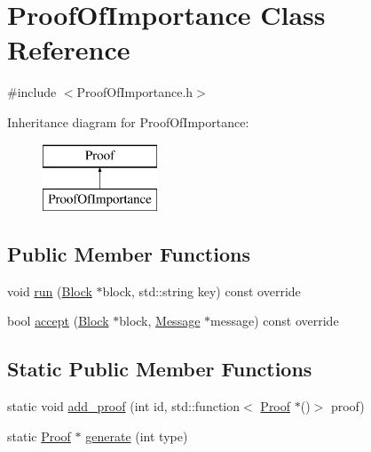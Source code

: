 \hypertarget{classProofOfImportance}{}\section{Proof\+Of\+Importance Class Reference}
\label{classProofOfImportance}


{\ttfamily \#include $<$Proof\+Of\+Importance.\+h$>$}

Inheritance diagram for Proof\+Of\+Importance\+:\begin{figure}[H]
\begin{center}
\leavevmode
\includegraphics[height=2.000000cm]{classProofOfImportance}
\end{center}
\end{figure}
\subsection*{Public Member Functions}
\begin{DoxyCompactItemize}
\item 
void \mbox{\hyperlink{classProofOfImportance_a08f72d852cefc73c21bc22cbdaf956ff}{run}} (\mbox{\hyperlink{classBlock}{Block}} $\ast$block, std\+::string key) const override
\item 
bool \mbox{\hyperlink{classProofOfImportance_a42a29f16c0c9e5e097fd734b7ee3fcf8}{accept}} (\mbox{\hyperlink{classBlock}{Block}} $\ast$block, \mbox{\hyperlink{classMessage}{Message}} $\ast$message) const override
\end{DoxyCompactItemize}
\subsection*{Static Public Member Functions}
\begin{DoxyCompactItemize}
\item 
static void \mbox{\hyperlink{classProof_a71874539fdbcc93c15594b889c95225b}{add\+\_\+proof}} (int id, std\+::function$<$ \mbox{\hyperlink{classProof}{Proof}} $\ast$()$>$ proof)
\item 
static \mbox{\hyperlink{classProof}{Proof}} $\ast$ \mbox{\hyperlink{classProof_a267f0f4587babb59884b5f280e2d54c8}{generate}} (int type)
\end{DoxyCompactItemize}
